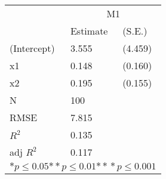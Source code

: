 \begin{tabular}{*{3}{l}}
\hline
                  & \multicolumn{2}{c}{M1}   \tabularnewline
                   &Estimate  &(S.E.)  \tabularnewline
 \hline
 \hline
   (Intercept)     &3.555   &   (4.459) \tabularnewline
   x1              &0.148   &   (0.160) \tabularnewline
   x2              &0.195   &   (0.155) \tabularnewline
 \hline
 N                 &100       &        \tabularnewline
 RMSE             &7.815         & \tabularnewline
 $R^2$             &0.135         & \tabularnewline
 adj $R^2$         &0.117         & \tabularnewline
 \hline
\hline
 
 \multicolumn{3}{c}{${*  p}\le 0.05$${*\!\!*  p}\le 0.01$${*\!\!*\!\!*  p}\le 0.001$}\tabularnewline
 \end{tabular}
